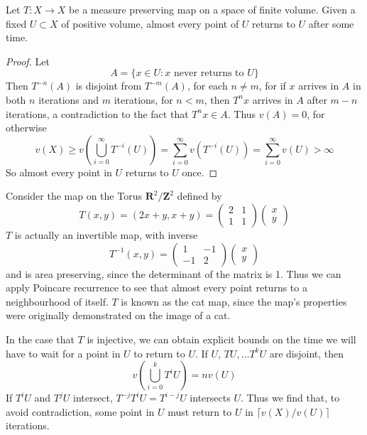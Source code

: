 \begin{theorem}
    Let $T: X \to X$ be a measure preserving map on a space of finite volume. Given a fixed $U \subset X$ of positive volume, almost every point of $U$ returns to $U$ after some time.
\end{theorem}
\begin{proof}
    Let
    \[ A = \{ x \in U : \text{$x$ never returns to $U$} \} \]
    Then $T^{-n}(A)$ is disjoint from $T^{-m}(A)$, for each $n \neq m$, for if $x$ arrives in $A$ in both $n$ iterations and $m$ iterations, for $n < m$, then $T^n x$ arrives in $A$ after $m - n$ iterations, a contradiction to the fact that $T^n x \in A$. Thus $v(A) = 0$, for otherwise
    \[ v(X) \geq v\left( \bigcup_{i = 0}^\infty T^{-i}(U) \right) = \sum_{i = 0}^\infty v(T^{-i}(U)) = \sum_{i = 0}^\infty v(U) > \infty \]
    So almost every point in $U$ returns to $U$ once.
\end{proof}

\begin{example}
    Consider the map on the Torus $\mathbf{R}^2 / \mathbf{Z}^2$ defined by
    \[ T(x,y) = (2x + y, x + y) = \begin{pmatrix} 2 & 1 \\ 1 & 1 \end{pmatrix} \begin{pmatrix} x \\ y \end{pmatrix} \]
    $T$ is actually an invertible map, with inverse
    \[ T^{-1}(x,y) = \begin{pmatrix} 1 & -1 \\ -1 & 2 \end{pmatrix} \begin{pmatrix} x \\ y \end{pmatrix} \]
    and is area preserving, since the determinant of the matrix is 1. Thus we can apply Poincare recurrence to see that almost every point returns to a neighbourhood of itself. $T$ is known as the cat map, since the map's properties were originally demonstrated on the image of a cat.
\end{example}

In the case that $T$ is injective, we can obtain explicit bounds on the time we will have to wait for a point in $U$ to return to $U$. If $U$, $T U, \dots T^k U$ are disjoint, then
%
\[ v(\bigcup_{i = 0}^k T^i U) = n v(U) \]
%
If $T^iU$ and $T^jU$ intersect, $T^{-j}T^iU = T^{i-j}U$ intersects $U$. Thus we find that, to avoid contradiction, some point in $U$ must return to $U$ in $\lceil v(X)/v(U) \rceil$ iterations.

